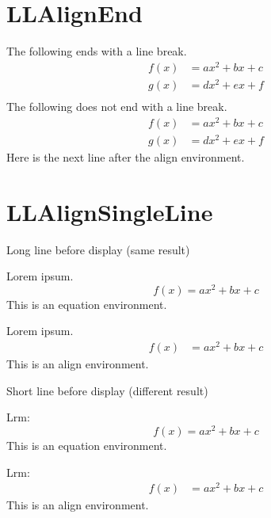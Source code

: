 \documentclass[a4paper]{article}
\newcommand{\tA}[1]{\textcolor{cA}{#1}}
\newcommand{\tD}[1]{\textcolor{cD}{#1}}
\begin{document}
\section{LLAlignEnd}

The following ends with a line break.
\begin{align*}
	f(x) & = ax^2 + bx + c \\
	g(x) & = dx^2 + ex + f \\
\end{align*}
The following does not end with a line break.
\begin{align*}
	f(x) & = ax^2 + bx + c \\
	g(x) & = dx^2 + ex + f
\end{align*}
Here is the next line after the align environment.

\section{LLAlignSingleLine}

\begin{itembox}{\large Long line before display (same result)}
	\begin{minipage}[t]{.5\columnwidth}
		Lorem ipsum.
		\begin{equation*}
			f(x) = ax^2 + bx + c
		\end{equation*}
		This is an \tA{equation} environment.
	\end{minipage}%
	\begin{minipage}[t]{.5\columnwidth}
		Lorem ipsum.
		\begin{align*}
			f(x) & = ax^2 + bx + c
		\end{align*}
		This is an \tD{align} environment.
	\end{minipage}
\end{itembox}

\vspace{\baselineskip}

\begin{itembox}{\large Short line before display (different result)}
	\begin{minipage}[t]{.5\columnwidth}
		Lrm:
		\begin{equation*}
			f(x) = ax^2 + bx + c
		\end{equation*}
		This is an \tA{equation} environment.
	\end{minipage}%
	\begin{minipage}[t]{.5\columnwidth}
		Lrm:
		\begin{align*}
			f(x) & = ax^2 + bx + c
		\end{align*}
		This is an \tD{align} environment.
	\end{minipage}
\end{itembox}
\end{document}
